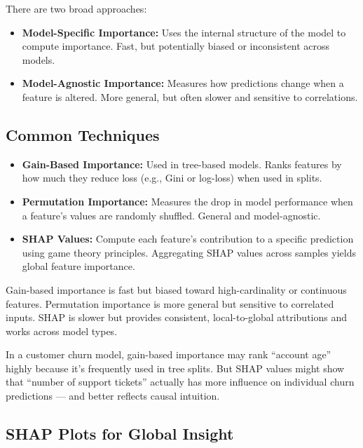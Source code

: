 \documentclass[12pt,openany]{book}
\begin{document}
There are two broad approaches:

\begin{itemize}
    \item \textbf{Model-Specific Importance:} Uses the internal structure of the model to compute importance. Fast, but potentially biased or inconsistent across models.
    \item \textbf{Model-Agnostic Importance:} Measures how predictions change when a feature is altered. More general, but often slower and sensitive to correlations.
\end{itemize}

\subsection{Common Techniques}

\begin{itemize}
    \item \textbf{Gain-Based Importance:} Used in tree-based models. Ranks features by how much they reduce loss (e.g., Gini or log-loss) when used in splits.
    \item \textbf{Permutation Importance:} Measures the drop in model performance when a feature’s values are randomly shuffled. General and model-agnostic.
    \item \textbf{SHAP Values:} Compute each feature’s contribution to a specific prediction using game theory principles. Aggregating SHAP values across samples yields global feature importance.
\end{itemize}

\begin{notebox}
Gain-based importance is fast but biased toward high-cardinality or continuous features. Permutation importance is more general but sensitive to correlated inputs. SHAP is slower but provides consistent, local-to-global attributions and works across model types.
\end{notebox}

\begin{examplebox}
In a customer churn model, gain-based importance may rank ``account age'' highly because it's frequently used in tree splits. But SHAP values might show that ``number of support tickets'' actually has more influence on individual churn predictions — and better reflects causal intuition.
\end{examplebox}

\subsection{SHAP Plots for Global Insight}
\end{document}

